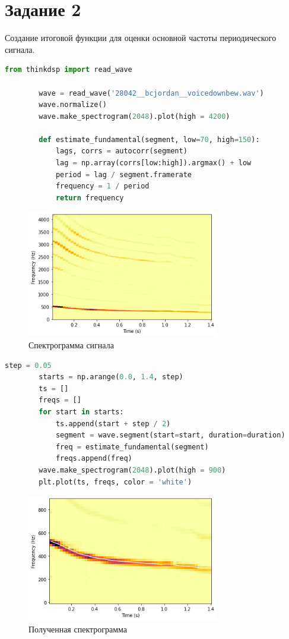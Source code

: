 \documentclass[a4paper, 12pt]{report}
\begin{document}
	\section{Задание 2}
	Создание итоговой функции для оценки основной частоты периодического сигнала.
	\begin{lstlisting}[language=Python,caption=Итоговая функция]
		from thinkdsp import read_wave

		wave = read_wave('28042__bcjordan__voicedownbew.wav')
		wave.normalize()
		wave.make_spectrogram(2048).plot(high = 4200)

		def estimate_fundamental(segment, low=70, high=150):
			lags, corrs = autocorr(segment)
			lag = np.array(corrs[low:high]).argmax() + low
			period = lag / segment.framerate
			frequency = 1 / period
			return frequency
	\end{lstlisting}
	\begin{figure}[H]
		\centering
		\includegraphics[width=0.75\textwidth]{test1.png}
		\caption{Спектрограмма сигнала}
		\label{fig:test1}
	\end{figure}
	\begin{lstlisting}[language=Python,caption=Проверка работы функции]
		step = 0.05
		starts = np.arange(0.0, 1.4, step)
		ts = []
		freqs = []
		for start in starts:
			ts.append(start + step / 2)
			segment = wave.segment(start=start, duration=duration)
			freq = estimate_fundamental(segment)
			freqs.append(freq)
		wave.make_spectrogram(2048).plot(high = 900)
		plt.plot(ts, freqs, color = 'white')
	\end{lstlisting}
	\begin{figure}[H]
		\centering
		\includegraphics[width=0.75\textwidth]{test2.png}
		\caption{Полученная спектрограмма}
		\label{fig:test2}
	\end{figure}
	
\end{document}
